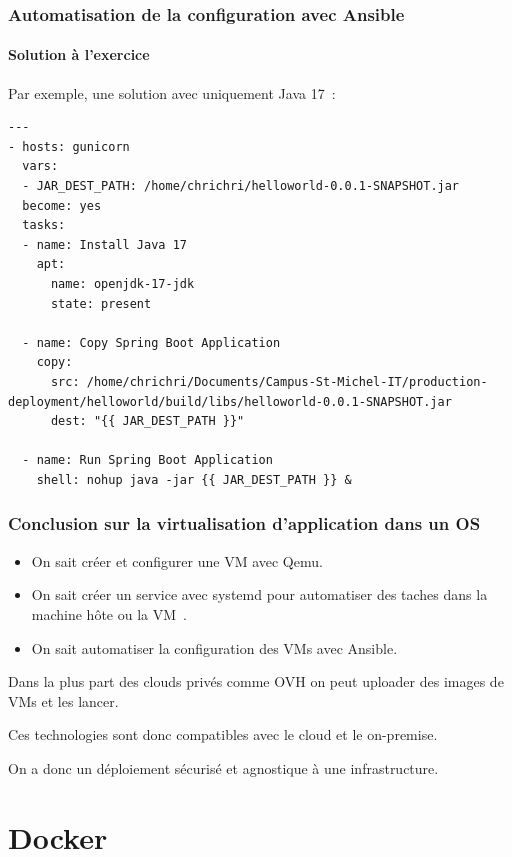 \documentclass{beamer}
\begin{document}
    \begin{frame}[fragile]
        \transdissolve
        \frametitle{Automatisation de la configuration avec Ansible}
        \framesubtitle{Solution à l'exercice}
        Par exemple, une solution avec uniquement Java 17~:
        \begin{lstlisting}[basicstyle=\ttfamily\tiny]
---
- hosts: gunicorn
  vars:
  - JAR_DEST_PATH: /home/chrichri/helloworld-0.0.1-SNAPSHOT.jar
  become: yes
  tasks:
  - name: Install Java 17
    apt:
      name: openjdk-17-jdk
      state: present

  - name: Copy Spring Boot Application
    copy:
      src: /home/chrichri/Documents/Campus-St-Michel-IT/production-deployment/helloworld/build/libs/helloworld-0.0.1-SNAPSHOT.jar
      dest: "{{ JAR_DEST_PATH }}"

  - name: Run Spring Boot Application
    shell: nohup java -jar {{ JAR_DEST_PATH }} &
        \end{lstlisting}
    \end{frame}


    \begin{frame}
        \transdissolve
        \frametitle{Conclusion sur la virtualisation d'application dans un OS}
        \begin{itemize}
            \item On sait créer et configurer une VM avec Qemu.
            \item On sait créer un service avec systemd pour automatiser des taches dans la machine hôte ou la VM~.
            \item On sait automatiser la configuration des VMs avec Ansible.
        \end{itemize}
        \bigbreak
        Dans la plus part des clouds privés comme OVH on peut uploader des images de VMs et les lancer.

        Ces technologies sont donc compatibles avec le cloud et le on-premise.

        On a donc un déploiement sécurisé et agnostique à une infrastructure.
    \end{frame}


    \section{Docker}\label{sec:docker}
\end{document}
